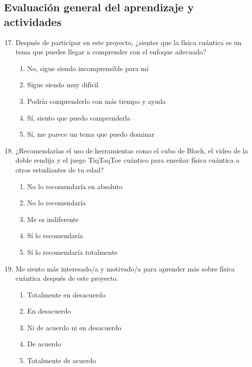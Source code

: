 \documentclass[10pt,a4paper]{article}
\begin{document}
\subsection{Evaluación general del aprendizaje y actividades}
\begin{enumerate}
    \setcounter{enumi}{16} %
    \item Después de participar en este proyecto, ¿sientes que la física cuántica es un tema que puedes llegar a comprender con el enfoque adecuado?
    \begin{enumerate}[label=\alph*)]
        \item No, sigue siendo incomprensible para mí
        \item Sigue siendo muy difícil
        \item Podría comprenderlo con más tiempo y ayuda
        \item Sí, siento que puedo comprenderla
        \item Sí, me parece un tema que puedo dominar
    \end{enumerate}

    \item ¿Recomendarías el uso de herramientas como el cubo de Bloch, el video de la doble rendija y el juego TiqTaqToe cuántico para enseñar física cuántica a otros estudiantes de tu edad?
    \begin{enumerate}[label=\alph*)]
        \item No lo recomendaría en absoluto
        \item No lo recomendaría
        \item Me es indiferente
        \item Sí lo recomendaría
        \item Sí lo recomendaría totalmente
    \end{enumerate}
\newpage
    \item Me siento más interesado/a y motivado/a para aprender más sobre física cuántica después de este proyecto.
    \begin{enumerate}[label=\alph*)]
        \item Totalmente en desacuerdo
        \item En desacuerdo
        \item Ni de acuerdo ni en desacuerdo
        \item De acuerdo
        \item Totalmente de acuerdo
    \end{enumerate}
    

\end{enumerate}
\end{document}
